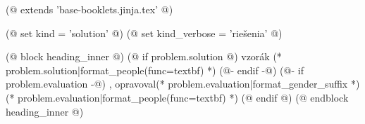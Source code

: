 (@ extends 'base-booklets.jinja.tex' @)

(@ set kind = 'solution' @)
(@ set kind_verbose = 'riešenia' @)

(@ block heading_inner @)
    (@ if problem.solution @)%
        vzorák (* problem.solution|format_people(func=textbf) *)%
    (@- endif -@)%
    (@- if problem.evaluation -@)%
        , opravoval(* problem.evaluation|format_gender_suffix *) (* problem.evaluation|format_people(func=textbf) *)%
    (@ endif @)%
(@ endblock heading_inner @)
